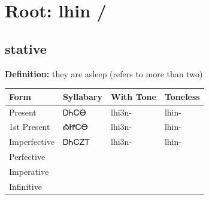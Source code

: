 \documentclass{article}%
\begin{document}
%
\normalsize%
\section*{Root: lhin / }%
\subsection*{stative}%
\textbf{Definition: }%
they are asleep (refers to more than two)%
\\[0.5em]%
\begin{tabular}{|l|l|l|l|}%
\hline%
\textbf{Form}&\textbf{Syllabary}&\textbf{With Tone}&\textbf{Toneless}\\%
\hline%
Present&ᎠᏂᏟᎾ&lhi3n{-}&lhin{-}\\%
1st Present&ᎣᏥᏟᎾ&lhi3n{-}&lhin{-}\\%
Imperfective&ᎠᏂᏟᏃᎢ&lhi3n{-}&lhin{-}\\%
Perfective&&&\\%
Imperative&&&\\%
Infinitive&&&\\%
\hline%
\end{tabular}%
\\[1em]%
\end{document}
